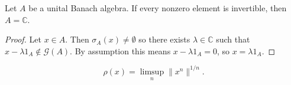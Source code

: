 \documentclass[12pt]{article}
\begin{document}
\begin{theorem}
\label{thm_gelfand_mazur}
	Let $A$ be a unital Banach algebra. If every nonzero element is invertible, then $A=\mathbb{C}$. 
\end{theorem}
\begin{proof}
	Let $x\in A$. Then $\sigma_A(x)\neq \emptyset$ so there exists $\lambda\in\mathbb{C}$ such that $x-\lambda 1_A\not\in\mathcal{G}(A)$. By assumption this means $x-\lambda 1_A=0$, so $x=\lambda 1_A$.
\end{proof}

\begin{theorem}
\label{thm_gelfands_formula}
	\begin{equation*}
		\rho(x) = \limsup_n \|x^n\|^{1/n}.
	\end{equation*}
\end{theorem}
\end{document}
